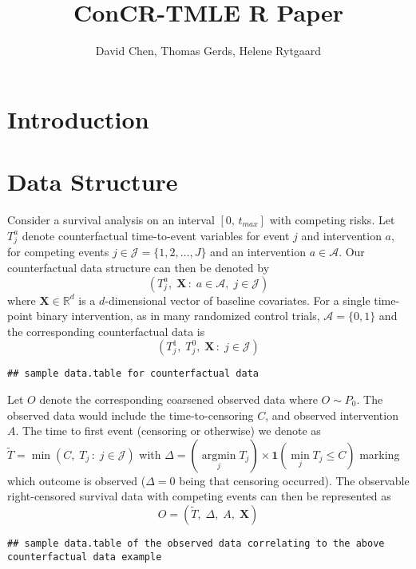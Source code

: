 \documentclass{report}
\author{David Chen, Thomas Gerds, Helene Rytgaard}
\date{}
\title{ConCR-TMLE R Paper}
\newcommand{\1}{\ensuremath{\mathbf{1}}}
\DeclareMathOperator*{\argmin}{argmin}
\newcommand{\T}{\ensuremath{\widetilde{T}}}
\newcommand{\X}{\ensuremath{\mathbf{X}}}
\begin{document}
\maketitle
{}

\section*{Introduction}
\label{sec:org294feb9}

\section*{Data Structure}
\label{sec:org092e9f3}

Consider a survival analysis on an interval \([0,\,t_{max}]\) with competing risks. Let \(T^a_j\) denote counterfactual time-to-event variables for event \(j\) and intervention \(a\), for competing events \(j \in \mathcal{J} = \{1, 2, \dots, J\}\) and an intervention \(a \in \mathcal{A}\). Our counterfactual data structure can then be denoted by
\[(T^a_j,\;\X\,:\;a\in\mathcal{A},\;j\in\mathcal{J})\]
where \(\X \in \mathbb{R}^d\) is a \(d\)-dimensional vector of baseline covariates. For a single time-point binary intervention, as in many randomized control trials, \(\mathcal{A} = \{0, 1\}\) and the corresponding counterfactual data is 
\[ (T^1_j,\; T^0_j,\;\X\,: \;j\in\mathcal{J})\]

\begin{lstlisting}
## sample data.table for counterfactual data
\end{lstlisting}

\noindent Let $O$ denote the corresponding coarsened observed data where $O \sim P_0$. The observed data would include the time-to-censoring $C$, and observed intervention $A$. The time to first event (censoring or otherwise) we denote as $\T = \min(C,\; T_j\,: \; j \in \mathcal{J})$ with $\Delta = (\argmin\limits_j T_j) \times \1(\min\limits_j T_j \leq C)$ marking which outcome is observed ($\Delta = 0$ being that censoring occurred). The observable right-censored survival data with competing events can then be represented as 
\[O = (\T,\;\Delta,\;A,\;\X)\]

\begin{lstlisting}
## sample data.table of the observed data correlating to the above counterfactual data example
\end{lstlisting}
\end{document}
